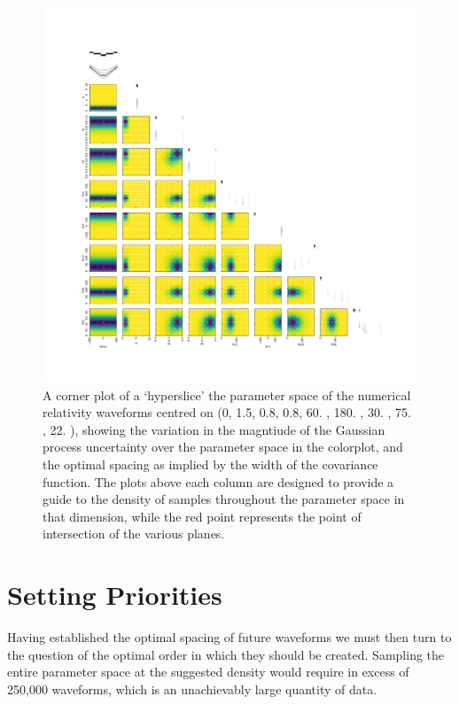 \documentclass[a4paper]{article}
\begin{document}
\begin{figure}
  \centering
  \includegraphics[width=\textwidth]{spacings.pdf}
  \caption{A corner plot of a `hyperslice' the parameter space of the numerical relativity waveforms centred on (0,  1.5,    0.8,    0.8,   60. ,  180. ,   30. ,   75. ,   22. ), showing the variation in the magntiude of the Gaussian process uncertainty over the parameter space in the colorplot, and the optimal spacing as implied by the width of the covariance function. The plots above each column are designed to provide a guide to the density of samples throughout the parameter space in that dimension, while the red point represents the point of intersection of the various planes. }
  \label{fig:spacing}
\end{figure}

\section{Setting Priorities}
\label{sec:priorities}

Having established the optimal spacing of future waveforms we must
then turn to the question of the optimal order in which they should be
created. Sampling the entire parameter space at the suggested density
would require in excess of 250,000 waveforms, which is an unachievably
large quantity of data.
\end{document}
